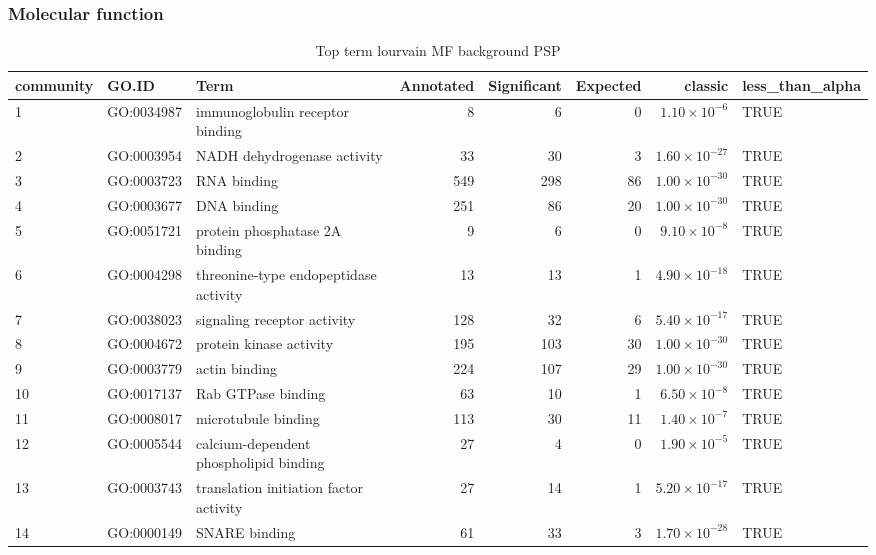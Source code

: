 \subsubsection{Molecular function}
\begin{table}[ht]
\centering
\begin{adjustbox}{max width=\textwidth}
\begin{tabular}{lllrrrrl}
  \hline
community & GO.ID & Term & Annotated & Significant & Expected & classic & less\_than\_alpha \\ 
  \hline
1 & GO:0034987 & immunoglobulin receptor binding & 8 & 6 & 0 & $1.10 \times 10^{-6}$ & TRUE \\ 
  2 & GO:0003954 & NADH dehydrogenase activity & 33 & 30 & 3 & $1.60 \times 10^{-27}$ & TRUE \\ 
  3 & GO:0003723 & RNA binding & 549 & 298 & 86 & $1.00 \times 10^{-30}$ & TRUE \\ 
  4 & GO:0003677 & DNA binding & 251 & 86 & 20 & $1.00 \times 10^{-30}$ & TRUE \\ 
  5 & GO:0051721 & protein phosphatase 2A binding & 9 & 6 & 0 & $9.10 \times 10^{-8}$ & TRUE \\ 
  6 & GO:0004298 & threonine-type endopeptidase activity & 13 & 13 & 1 & $4.90 \times 10^{-18}$ & TRUE \\ 
  7 & GO:0038023 & signaling receptor activity & 128 & 32 & 6 & $5.40 \times 10^{-17}$ & TRUE \\ 
  8 & GO:0004672 & protein kinase activity & 195 & 103 & 30 & $1.00 \times 10^{-30}$ & TRUE \\ 
  9 & GO:0003779 & actin binding & 224 & 107 & 29 & $1.00 \times 10^{-30}$ & TRUE \\ 
  10 & GO:0017137 & Rab GTPase binding & 63 & 10 & 1 & $6.50 \times 10^{-8}$ & TRUE \\ 
  11 & GO:0008017 & microtubule binding & 113 & 30 & 11 & $1.40 \times 10^{-7}$ & TRUE \\ 
  12 & GO:0005544 & calcium-dependent phospholipid binding & 27 & 4 & 0 & $1.90 \times 10^{-5}$ & TRUE \\ 
  13 & GO:0003743 & translation initiation factor activity & 27 & 14 & 1 & $5.20 \times 10^{-17}$ & TRUE \\ 
  14 & GO:0000149 & SNARE binding & 61 & 33 & 3 & $1.70 \times 10^{-28}$ & TRUE \\ 
   \hline
\end{tabular}
\end{adjustbox}
\caption{Top term  lourvain MF background PSP} 
\label{tab:Top term  lourvain MF background PSP}
\end{table}


